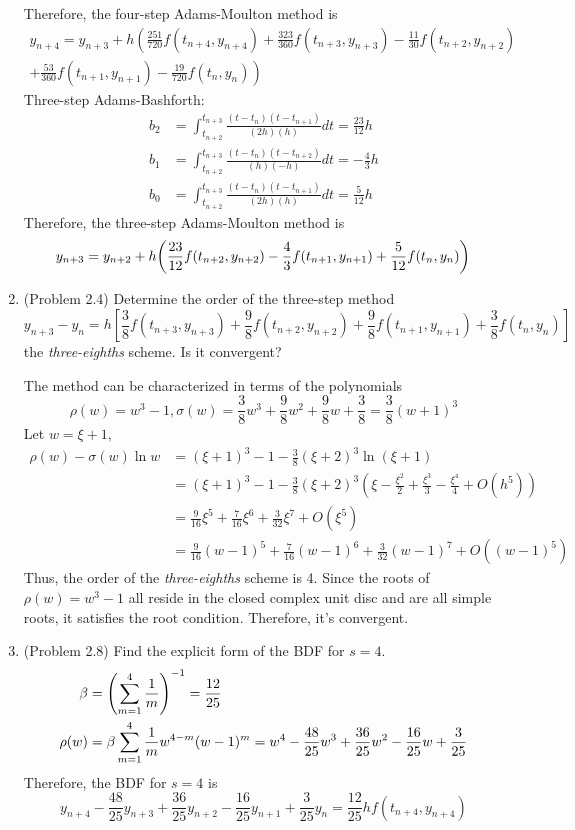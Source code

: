 \documentclass[10pt]{report}
\newcommand{\dintt}[4] {\int_{#1}^{#2} #3 d#4}
\DeclarePairedDelimiter\autoparen{(}{)}
\newcommand{\pa}[1]{\autoparen*{#1}}
\begin{document}
\begin{enumerate}
	Therefore, the four-step Adams-Moulton method is
	\begin{multline*}
	y_{n+4} = y_{n+3} + h \left( \frac{251}{720} f(t_{n+4},y_{n+4}) + \frac{323}{360} f(t_{n+3},y_{n+3}) - \frac{11}{30} f(t_{n+2},y_{n+2}) \right.\\
	\left. + \frac{53}{360} f(t_{n+1},y_{n+1}) - \frac{19}{720} f(t_n,y_n) \right)
	\end{multline*}
	Three-step Adams-Bashforth:
	\begin{align*}
	b_2 &= \dintt{t_{n+2}}{t_{n+3}}{
		\frac{ (t-t_{n})(t-t_{n+1}) }{ (2h)(h) }}{t}
	= \frac{23}{12}h\\
	b_1 &= \dintt{t_{n+2}}{t_{n+3}}{
		\frac{ (t-t_{n})(t-t_{n+2}) }{ (h)(-h) }}{t}
	= -\frac{4}{3}h\\
	b_0 &= \dintt{t_{n+2}}{t_{n+3}}{
		\frac{ (t-t_{n})(t-t_{n+1}) }{ (2h)(h) }}{t}
	= \frac{5}{12}h
	\end{align*}
	Therefore, the three-step Adams-Moulton method is
	\[
	y_{n+3} = y_{n+2} + h \pa{\frac{23}{12} f(t_{n+2},y_{n+2}) - \frac{4}{3} f(t_{n+1},y_{n+1}) + \frac{5}{12} f(t_n,y_n)}
	\]
	
	\item 
	(Problem 2.4) Determine the order of the three-step method
	\[
	y_{n+3} - y_n = h\left[\frac{3}{8}f(t_{n+3}, y_{n+3})+ \frac{9}{8}f(t_{n+2}, y_{n+2}) + \frac{9}{8}f(t_{n+1}, y_{n+1}) + \frac{3}{8}f(t_{n}, y_{n})\right]
	\]
	the \textit{three-eighths} scheme. Is it convergent?
	
	The method can be characterized in terms of the polynomials
	\[
	\rho(w) = w^3 - 1, \sigma(w) = \frac{3}{8}w^3 + \frac{9}{8}w^2 + \frac{9}{8}w + \frac{3}{8} = \frac{3}{8}(w+1)^3
	\]
	Let $w = \xi + 1$,
	\begin{align*}
	\rho(w) - \sigma(w) \ln{w}
	&=(\xi + 1)^3 - 1 - \frac{3}{8}(\xi+2)^3 \ln(\xi + 1) \\
	&=(\xi + 1)^3 - 1 - \frac{3}{8}(\xi+2)^3 (\xi - \frac{\xi^2}{2} + \frac{\xi^3}{3} - \frac{\xi^4}{4} + O(h^5))\\
	&=\frac{9}{16}\xi^5 + \frac{7}{16}\xi^6 + \frac{3}{32}\xi^7 + O(\xi^5)\\
	&=\frac{9}{16}(w-1)^5 + \frac{7}{16}(w-1)^6 + \frac{3}{32}(w-1)^7 + O((w-1)^5)
	\end{align*}
	Thus, the order of the \textit{three-eighths} scheme is 4. Since the roots of $\rho(w) = w^3 - 1$ all reside in the closed complex unit disc and are all simple roots, it satisfies the root condition. Therefore, it's convergent.
	
	\item 
	(Problem 2.8) Find the explicit form of the BDF for $s = 4$.
	\begin{align*}
	\beta &= \pa{\sum_{m=1}^{4} \frac{1}{m}}^{-1} = \frac{12}{25}\\
	\rho(w) &= \beta \sum_{m=1}^{4} \frac{1}{m} w^{4-m}(w-1)^m = w^4 - \frac{48}{25}w^3 + \frac{36}{25}w^2 - \frac{16}{25}w + \frac{3}{25}
	\end{align*}
	Therefore, the BDF for $s = 4$ is
	\[
	y_{n+4} - \frac{48}{25}y_{n+3} + \frac{36}{25}y_{n+2} - \frac{16}{25}y_{n+1} + \frac{3}{25}y_{n} = \frac{12}{25}hf(t_{n+4}, y_{n+4})
	\]
\end{enumerate}
\end{document}

